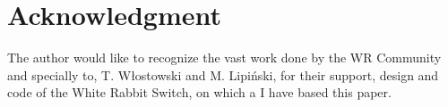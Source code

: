\section{Acknowledgment}

The author would like to recognize the vast work done by the WR Community 
and specially to, T. W\l{}ostowski and M. Lipiński, for their support,  
design and code of the White Rabbit Switch, on which a I have based this paper.
